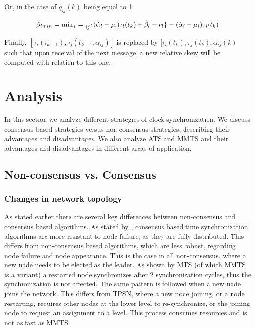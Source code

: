 \documentclass[a4paper,12pt]{article}
\begin{document}
    Or, in the case of $q_{ij}(k)$ being equal to 1:
    
    \begin{equation}
         \hat{\beta}_{imin} = \min{_l} = \prescript{}{ij}{\{ ( \hat{\alpha}_l - \mu_l ) \tau_l(t_k) + \hat{\beta}_l - \nu_l \}} - ( \hat{\alpha}_i - \mu_i ) \tau_i(t_k) 
    \end{equation}
    
    Finally, $[\tau_i(t_{k-1}), \tau_j(t_{k-1},\alpha_{ij})]$ is replaced by $[\tau_i(t_k), \tau_j(t_k),\alpha_{ij}(k)$ such that upon receival of the next message, a new relative skew will be computed with relation to this one.
    
    

\section{Analysis}

In this section we analyze different strategies of clock synchronization. We discuss consensus-based strategies versus non-consensus strategies, describing their advantages and disadvantages. We also analyze ATS and MMTS and their advantages and disadvantages in different areas of application.

\subsection{Non-consensus vs. Consensus}

\subsubsection{Changes in network topology} As stated earlier there are several key differences between non-consensus and consensus based algorithms. As stated by \citet{SchenatoGamba07}, consensus based time synchronization algorithms are more resistant to node failure, as they are fully distributed. This differs from non-consensus based algorithms, which are less robust, regarding node failure and node appearance. This is the case in all non-consensus, where a new node needs to be elected as the leader. As shown by \citet{HeLiChenCheng13} MTS (of which MMTS is a variant) a restarted node synchronizes after 2 synchronization cycles, thus the synchronization is not affected. The same pattern is followed when a new node joins the network. This differs from TPSN, where a new node joining, or a node restarting, requires other nodes at the lower level to re-synchronize, or the joining node to request an assignment to a level. This process consumes resources and is not as fast as MMTS. 
\end{document}
